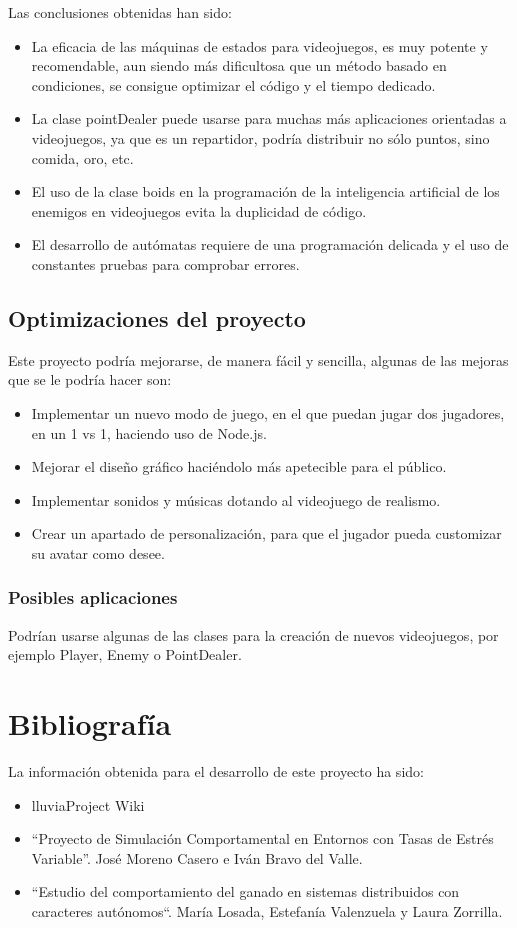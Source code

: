 \documentclass[a4paper,10pt]{article}
\begin{document}
Las conclusiones obtenidas han sido:

\begin{itemize}
 \item La eficacia de las máquinas de estados para videojuegos, 
 es muy potente y recomendable, aun siendo más dificultosa que un método
 basado en condiciones, se consigue optimizar el código y el tiempo dedicado.
 \item La clase pointDealer puede usarse para muchas más 
 aplicaciones orientadas a videojuegos, ya que es un repartidor, 
 podría distribuir no sólo puntos, sino comida, oro, etc.
 \item El uso de la clase boids en la programación de la 
 inteligencia artificial de los enemigos 
 en videojuegos evita la duplicidad de código.
 \item El desarrollo de autómatas requiere de una programación delicada 
 y el uso de constantes pruebas para comprobar errores.
\end{itemize}

\subsection {Optimizaciones del proyecto}

Este proyecto podría mejorarse, de manera fácil y sencilla, algunas de las mejoras
que se le podría hacer son:

\begin{itemize}
 \item Implementar un nuevo modo de juego, en el que puedan jugar dos jugadores, en un 1 vs 1, haciendo uso de Node.js.
 \item Mejorar el diseño gráfico haciéndolo más apetecible para el público.
 \item Implementar sonidos y músicas dotando al videojuego de realismo.
 \item Crear un apartado de personalización, para que el jugador pueda 
 customizar su avatar como desee.
\end{itemize}

\subsubsection {Posibles aplicaciones}
Podrían usarse algunas de las clases para la creación 
de nuevos videojuegos, por ejemplo Player, Enemy o PointDealer.
\cleardoublepage

\section{Bibliografía}
La información obtenida para el desarrollo de este proyecto ha sido:
\begin{itemize}
 \item lluviaProject Wiki
 \item “Proyecto de Simulación Comportamental en Entornos con Tasas de Estrés Variable”. 
 José Moreno Casero e Iván Bravo del Valle.
 \item “Estudio del comportamiento del ganado en sistemas distribuidos con caracteres autónomos“.
 María Losada, Estefanía Valenzuela y Laura Zorrilla.
\end{itemize}
\end{document}
